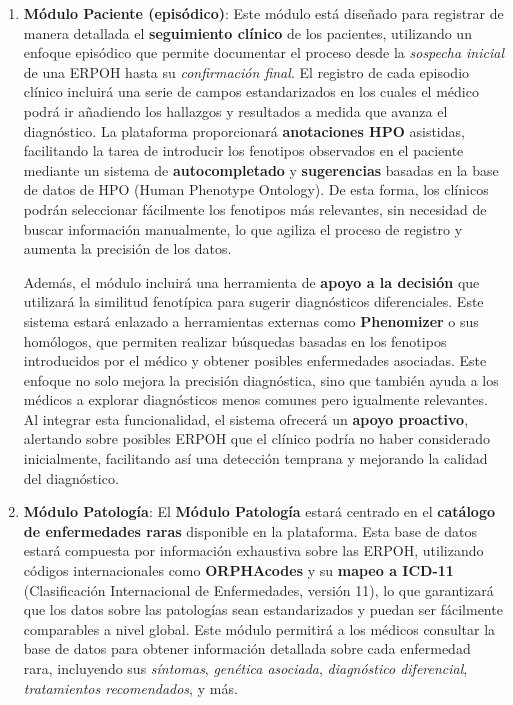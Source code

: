 \documentclass{article}
\begin{document}
\begin{enumerate}[leftmargin=1.2em]

  \item \textbf{Módulo Paciente (episódico)}:  
  Este módulo está diseñado para registrar de manera detallada el \textbf{seguimiento clínico} de los pacientes, utilizando un enfoque episódico que permite documentar el proceso desde la \textit{sospecha inicial} de una ERPOH hasta su \textit{confirmación final}. El registro de cada episodio clínico incluirá una serie de campos estandarizados en los cuales el médico podrá ir añadiendo los hallazgos y resultados a medida que avanza el diagnóstico. La plataforma proporcionará \textbf{anotaciones HPO} asistidas, facilitando la tarea de introducir los fenotipos observados en el paciente mediante un sistema de \textbf{autocompletado} y \textbf{sugerencias} basadas en la base de datos de HPO (Human Phenotype Ontology). De esta forma, los clínicos podrán seleccionar fácilmente los fenotipos más relevantes, sin necesidad de buscar información manualmente, lo que agiliza el proceso de registro y aumenta la precisión de los datos.  
   
  Además, el módulo incluirá una herramienta de \textbf{apoyo a la decisión} que utilizará la similitud fenotípica para sugerir diagnósticos diferenciales. Este sistema estará enlazado a herramientas externas como \textbf{Phenomizer} o sus homólogos, que permiten realizar búsquedas basadas en los fenotipos introducidos por el médico y obtener posibles enfermedades asociadas. Este enfoque no solo mejora la precisión diagnóstica, sino que también ayuda a los médicos a explorar diagnósticos menos comunes pero igualmente relevantes. Al integrar esta funcionalidad, el sistema ofrecerá un \textbf{apoyo proactivo}, alertando sobre posibles ERPOH que el clínico podría no haber considerado inicialmente, facilitando así una detección temprana y mejorando la calidad del diagnóstico.

  \item \textbf{Módulo Patología}:  
  El \textbf{Módulo Patología} estará centrado en el \textbf{catálogo de enfermedades raras} disponible en la plataforma. Esta base de datos estará compuesta por información exhaustiva sobre las ERPOH, utilizando códigos internacionales como \textbf{ORPHAcodes} y su \textbf{mapeo a ICD-11} (Clasificación Internacional de Enfermedades, versión 11), lo que garantizará que los datos sobre las patologías sean estandarizados y puedan ser fácilmente comparables a nivel global. Este módulo permitirá a los médicos consultar la base de datos para obtener información detallada sobre cada enfermedad rara, incluyendo sus \textit{síntomas}, \textit{genética asociada}, \textit{diagnóstico diferencial}, \textit{tratamientos recomendados}, y más. 


\end{enumerate}
\end{document}
